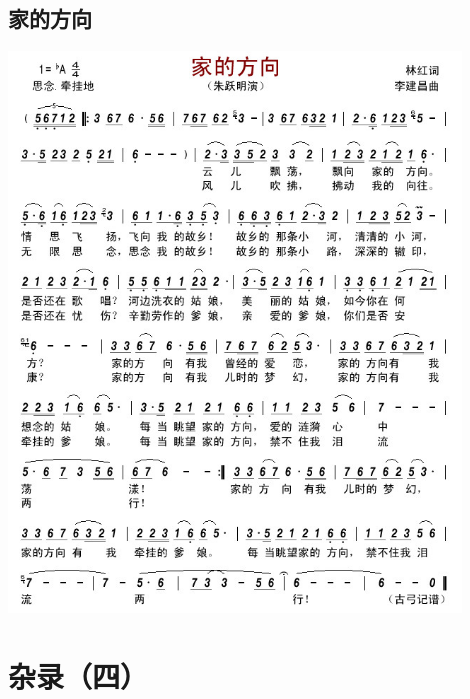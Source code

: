 \documentclass[cn,pad,twocol]{elegantbook}
\begin{document}
\section{家的方向}  \includegraphics[width=0.9\textwidth]{rpi400/20210130家的方向.jpg}

\chapter{杂录（四）}
\end{document}
